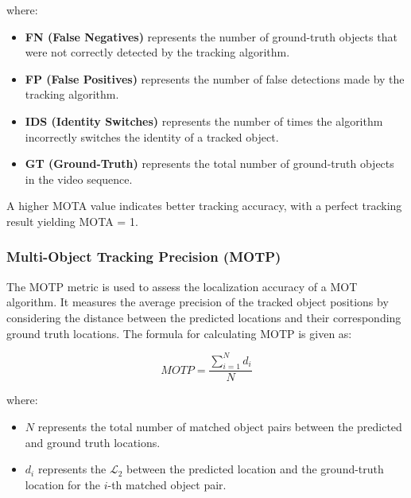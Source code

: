 where:

\begin{itemize}
	
	\item \textbf{FN (False Negatives)} represents the number of ground-truth objects that were not correctly detected by the tracking algorithm.
	
	\item \textbf{FP (False Positives)} represents the number of false detections made by the tracking algorithm.
	
	\item \textbf{IDS (Identity Switches)} represents the number of times the algorithm incorrectly switches the identity of a tracked object.
	
	\item \textbf{GT (Ground-Truth)} represents the total number of ground-truth objects in the video sequence.
	
\end{itemize}

A higher \ac{MOTA} value indicates better tracking accuracy, with a perfect tracking result yielding MOTA = 1.

\subsubsection{Multi-Object Tracking Precision (MOTP)}
\label{subsubsec:4_MOTP}

The \acf{MOTP} metric is used to assess the localization accuracy of a \ac{MOT} algorithm. It measures the average precision of the tracked object positions by considering the distance between the predicted locations and their corresponding ground truth locations. The formula for calculating \ac{MOTP} is given as:

\begin{equation}
	MOTP = \frac{{\sum_{{i=1}}^{{N}} d_i}}{{N}}
\end{equation}

where:

\begin{itemize}
	
	\item \textbf{\(N\)} represents the total number of matched object pairs between the predicted and ground truth locations.
	
	\item \textbf{\(d_i\)} represents the $\mathcal{L}_2$ between the predicted location and the ground-truth location for the \(i\)-th matched object pair.
	
\end{itemize}

